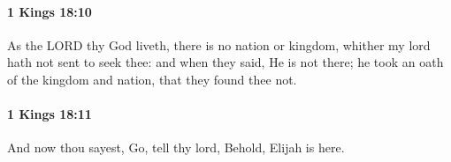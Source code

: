		\paragraph{1 Kings 18:10} %
			\label{1KINGS-18-10}

			As the LORD thy God liveth, there is no nation or kingdom, whither my lord hath not sent to seek thee: and when they said, He is not there; he took an oath of the kingdom and nation, that they found thee not.


		\paragraph{1 Kings 18:11} %
			\label{1KINGS-18-11}

			And now thou sayest, Go, tell thy lord, Behold, Elijah is here.


